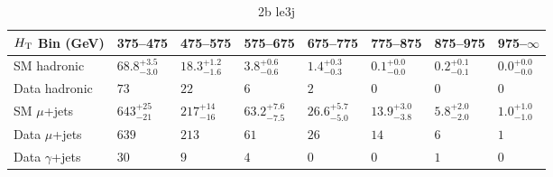 \documentclass[8pt]{article}
\def\scalht{\mbox{$H_{\rm{T}}$}\xspace}
\newcommand\T{\rule{0pt}{2.6ex}}
\newcommand\B{\rule[-1.2ex]{0pt}{0pt}}
\begin{document}
\begin{table}[ht!]
\caption{2b le3j}
\label{tab:ensemble-2b le3j}
\centering
\begin{tabular}{ llllllll }

\hline
\scalht Bin (GeV)       & 375--475                       & 475--575                       & 575--675                       & 675--775                       & 775--875                       & 875--975                       & 975--$\infty$                  \\ [1.000000ex]
\hline
SM hadronic\T           & $68.8^{+3.5}_{-3.0}$           & $18.3^{+1.2}_{-1.6}$           & $3.8^{+0.6}_{-0.6}$            & $1.4^{+0.3}_{-0.3}$            & $0.1^{+0.0}_{-0.0}$            & $0.2^{+0.1}_{-0.1}$            & $0.0^{+0.0}_{-0.0}$            \\ 
Data hadronic\B         & $73$                           & $22$                           & $6$                            & $2$                            & $0$                            & $0$                            & $0$                            \\ 
\hline
SM $\mu$+jets\T         & $643^{+25}_{-21}$              & $217^{+14}_{-16}$              & $63.2^{+7.6}_{-7.5}$           & $26.6^{+5.7}_{-5.0}$           & $13.9^{+3.0}_{-3.8}$           & $5.8^{+2.0}_{-2.0}$            & $1.0^{+1.0}_{-1.0}$            \\ 
Data $\mu$+jets\B       & $639$                          & $213$                          & $61$                           & $26$                           & $14$                           & $6$                            & $1$                            \\ 
\hline
Data $\gamma$+jets\B    & $30$                           & $9$                            & $4$                            & $0$                            & $0$                            & $1$                            & $0$                            \\ 
\hline

\end{tabular}
\end{table}
\end{document}
